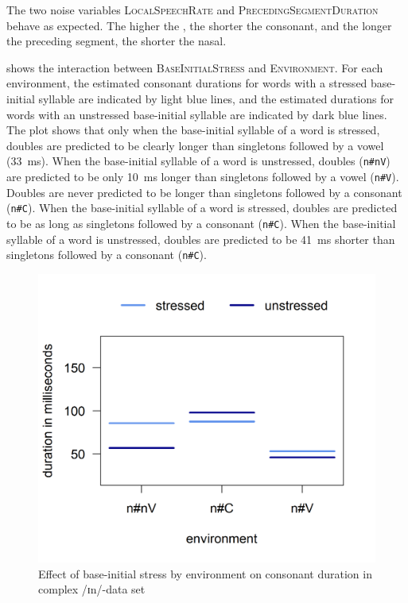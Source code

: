 The two noise variables \textsc{LocalSpeechRate} and \textsc{PrecedingSegmentDuration} behave as expected. The higher the , the shorter the consonant, and the longer the preceding segment, the shorter the nasal. 


 shows the interaction between \textsc{BaseInitialStress} and \textsc{Environment}. For each environment, the estimated consonant durations for words with a stressed base-initial syllable are indicated by light blue lines, and the estimated durations for words with an unstressed base-initial syllable are indicated by dark blue lines. 
The plot shows that only when the base-initial syllable of a word is stressed, doubles are predicted to be clearly longer than singletons followed by a vowel (33~ms). When the base-initial syllable of a word is unstressed, doubles (\texttt{n\#nV}) are predicted to be only 10~ms longer than singletons followed by a vowel (\texttt{n\#V}).
Doubles are never predicted to be longer than singletons followed by a consonant  (\texttt{n\#C}).
When the base-initial syllable of a word is stressed, doubles are predicted to be as long as singletons followed by a consonant (\texttt{n\#C}). When the base-initial syllable of a word is unstressed, doubles are predicted to be 41~ms shorter than singletons followed by a consonant (\texttt{n\#C}).




 	\begin{figure}

 		
 		\includegraphics [scale=0.5] {images/Experiment/InModelInterEnvStress}
		
 		\caption{Effect of base-initial stress by environment on consonant duration in complex /ɪn/-data set}		
 		\label{fig:Env Stress In experiment}

 	\end{figure}%
 	
